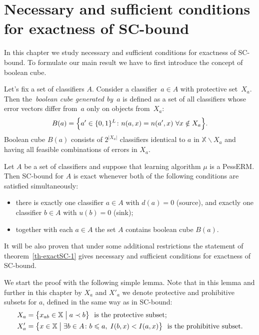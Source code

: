 \documentclass{article}
\def\XX{\mathbb{X}}
\renewcommand{\leq}{\leqslant}
\renewcommand{\emph}[1]{\textit{#1}}
\begin{document}
\section{Necessary and sufficient conditions for exactness of SC-bound}
In this chapter we study necessary and sufficient conditions for exactness of SC-bound.
To formulate our main result we have to first introduce the concept of boolean cube.

Let's fix a set of classifiers $A$.
Consider a classifier~$a \in A$ with protective set~$X_a$.
Then the~\emph{boolean cube generated by~$a$}
is defined as a set of all classifiers whose error vectors differ
from~$a$ only on objects from~$X_a$:
\[
    B(a) =
    \Bigl\{
        a^\prime \in \{0, 1\}^L
        \colon
        n(a, x) = n(a^\prime, x) \
        \forall x \notin X_a
    \Bigr\}.
\]
Boolean cube $B(a)$ consists of $2^{|X_a|}$ classifiers identical to $a$ in $\XX \backslash X_a$ and having all feasible combinations of errors in $X_a$.

\begin{theorem}
\label{th-exactSC-1}
Let $A$ be a set of classifiers and suppose that learning algorithm $\mu$ is a PessERM.
Then SC-bound for $A$ is exact whenever both of the following conditions are satisfied simultaneously:
\begin{itemize}
\item there is exactly one classifier $a \in A$ with $d(a) = 0$ (source), and exactly one classifier $b \in A$ with $u(b) = 0$ (sink);
\item together with each $a \in A$ the set $A$ contains boolean cube $B(a)$.
\end{itemize}
\end{theorem}

It will be also proven that under some additional restrictions the statement of theorem~\ref{th-exactSC-1}
gives necessary and sufficient conditions for exactness of SC-bound.

We start the proof with the following simple lemma. 
Note that in this lemma and further in this chapter by $X_a$ and $X'_a$ 
we denote protective and prohibitive subsets for $a$, defined in the same way as in SC-bound:
\begin{align*}
    X _a &= \bigl\{ x_{ab}\in\XX \bigm| a\prec b\bigr\}
            \text{~ is the protective subset};\\
    X'_a &= \bigl\{ x\in\XX \bigm| \exists b\in A\colon b\leq a,\; I(b,x)<I(a,x) \bigr\}
            \text{~ is the prohibitive subset}.
\end{align*}
\end{document}
